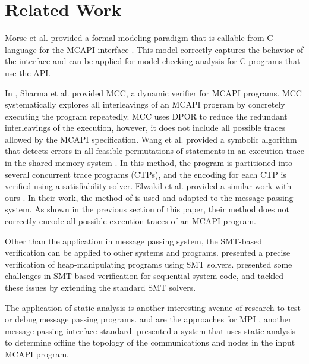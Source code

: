 \section{Related Work}
Morse et al. provided a formal modeling paradigm that is callable from C language for the MCAPI interface \cite{morse:vmcai12}. This model correctly captures the behavior of the interface and can be applied for model checking analysis for C programs that use the API.

In \cite{sharma:fmcad09}, Sharma et al. provided MCC, a dynamic verifier for MCAPI programs. MCC systematically explores all interleavings of an MCAPI program by concretely executing the program repeatedly. MCC uses DPOR \cite{flanagan:popl05} to reduce the redundant interleavings of the execution, however, it does not include all possible traces allowed by the MCAPI specification. Wang et al. provided a symbolic algorithm that detects errors in all feasible permutations of statements in an execution trace in the shared memory system \cite{wang:fse09}. In this method, the program is partitioned into several concurrent trace programs (CTPs), and the encoding for each CTP is verified using a satisfiability solver. Elwakil et al. provided a similar work with ours \cite{elwakil:atva10,elwakil:padtad10}. In their work, the method of \cite{wang:fse09} is used and adapted to the message passing system. As shown in the previous section of this paper, their method does not correctly encode all possible execution traces of an MCAPI program.

Other than the application in message passing system, the SMT-based verification can be applied to other systems and programs. \cite{lahiri:popl08} presented a precise verification of heap-manipulating programs using SMT solvers. \cite{lahiri:cav11} presented some challenges in SMT-based verification for sequential system code, and tackled these issues by extending the standard SMT solvers.

The application of static analysis is another interesting avenue of research to test or debug message passing programs. \cite{zhang:ppopp07} and \cite{greg:cgo09} are the approaches for MPI \cite{mpi}, another message passing interface standard. \cite{gray:lctes11} presented a system that uses static analysis to determine offline the topology of the communications and nodes in the input MCAPI program.
